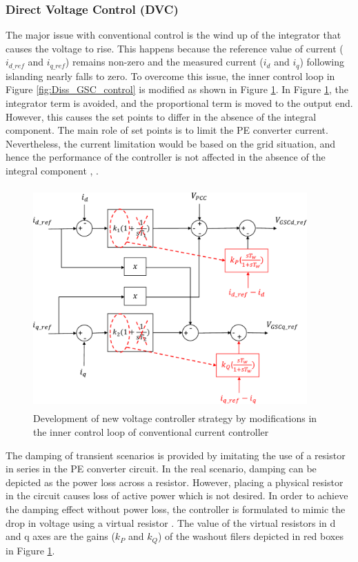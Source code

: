\subsubsection{Direct Voltage Control (DVC)}\label{DVC_theory}
The major issue with conventional control is the wind up of the integrator that causes the voltage to rise. This happens because the reference value of current ($i_{d\_ref}$ and $i_{q\_ref}$) remains non-zero and the measured current ($i_d$ and $i_q$) following islanding nearly falls to zero. To overcome this issue, the inner control loop in Figure \ref{fig:Diss_GSC_control} is modified as shown in Figure \ref{fig:Diss_DVC_control}. In Figure \ref{fig:Diss_DVC_control}, the integrator term is avoided, and the proportional term is moved to the output end. However, this causes the set points to differ in the absence of the integral component. The main role of set points is to limit the \gls{PE} converter current. Nevertheless, the current limitation would be based on the grid situation, and hence the performance of the controller is not affected in the absence of the integral component \cite{korai_dynamic_2019}, \cite{erlich_new_2017}.       

\begin{figure}[H]
\centering
    \includegraphics[height = 8.5cm,width = 10.5cm]{Diagrams/Chapter_2/Inner_control_GSC_chap2_2.pdf}
    \caption{ Development of new voltage controller strategy by modifications in the inner control loop of conventional current controller \cite{erlich_new_2017}}
    \label{fig:Diss_DVC_control}
\end{figure}

The damping of transient scenarios is provided by imitating the use of a resistor in series in the \gls{PE} converter circuit. In the real scenario, damping can be depicted as the power loss across a resistor. However, placing a physical resistor in the circuit causes loss of active power which is not desired. In order to achieve the damping effect without power loss, the controller is formulated to mimic the drop in voltage using a virtual resistor \cite{erlich_new_2017}. The value of the virtual resistors in d and q axes are the gains ($k_P$ and $k_Q$) of the washout filers depicted in red boxes in Figure \ref{fig:Diss_DVC_control}.

